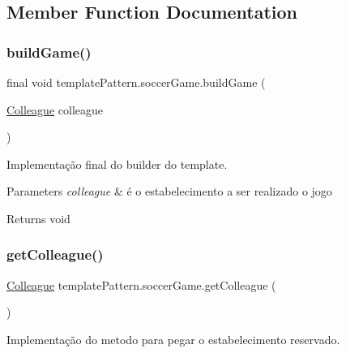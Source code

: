 \subsection{Member Function Documentation}
\mbox{\label{classtemplate_pattern_1_1soccer_game_a59ff3d4747285f938a4d290c2864ab55}} 
\subsubsection{\texorpdfstring{buildGame()}{buildGame()}}
{\footnotesize\ttfamily final void template\+Pattern.\+soccer\+Game.\+build\+Game (\begin{DoxyParamCaption}\item[{\mbox{\hyperlink{classmediator_pattern_1_1_colleague}{Colleague}}}]{colleague }\end{DoxyParamCaption})}



Implementação final do builder do template. 


\begin{DoxyParams}{Parameters}
{\em colleague} & é o estabelecimento a ser realizado o jogo \\
\hline
\end{DoxyParams}
\begin{DoxyReturn}{Returns}
void 
\end{DoxyReturn}
\mbox{\label{classtemplate_pattern_1_1soccer_game_a4f66a5d39bca540b9606547a58aa568a}} 
\subsubsection{\texorpdfstring{getColleague()}{getColleague()}}
{\footnotesize\ttfamily \mbox{\hyperlink{classmediator_pattern_1_1_colleague}{Colleague}} template\+Pattern.\+soccer\+Game.\+get\+Colleague (\begin{DoxyParamCaption}{ }\end{DoxyParamCaption})}



Implementação do metodo para pegar o estabelecimento reservado. 


